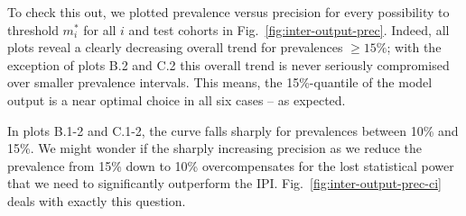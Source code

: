 To check this out, we plotted prevalence versus precision for every possibility to threshold 
$m^*_i$ for all $i$ and test cohorts in Fig.\ \ref{fig:inter-output-prec}. Indeed, all plots reveal 
a clearly decreasing overall trend for prevalences $\geq \num{15}\%$; with the exception of plots 
B.2 and C.2 this overall trend is never seriously compromised over smaller prevalence intervals. 
This means, the \num{15}\%-quantile of the model output is a near optimal choice in all six cases -- 
as expected.

In plots B.1-2 and C.1-2, the curve falls sharply for prevalences between \num{10}\% and \num{15}\%. 
We might wonder if the sharply increasing precision as we reduce the prevalence from \num{15}\% 
down to \num{10}\% overcompensates for the lost statistical power that we need to significantly 
outperform the IPI. Fig.\ \ref{fig:inter-output-prec-ci} deals with exactly this question.